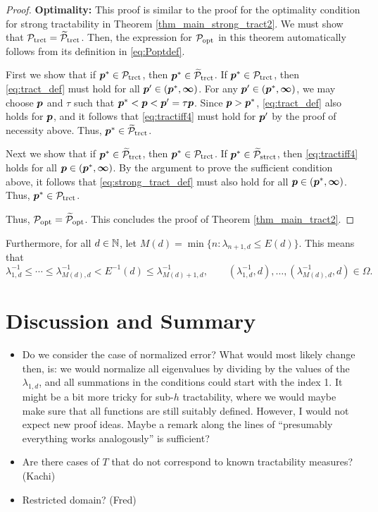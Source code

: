 \documentclass[11pt,a4paper]{article}
\newcommand{\fred}[1]{\begingroup\color{blue}#1\endgroup}
\newcommand{\peter}[1]{\begingroup\color{purple}#1\endgroup}
\newcommand{\vinfty}{\boldsymbol{\infty}}
\begin{document}
\begin{proof}
\noindent \textbf{Optimality:}
This proof is similar to the proof for the optimality condition for strong tractability in Theorem \ref{thm_main_strong_tract2}. We must show that $\mathcal{P}_{\textup{trct}} = \widetilde{\mathcal{P}}_{\textup{trct}}$.  Then, the expression for  $\mathcal{P}_{\textup{opt}}$ in this theorem automatically follows from its definition in \eqref{eq:Poptdef}.

First we show  that if $\boldsymbol{p}^* \in \mathcal{P}_{\textup{trct}}$, then $\boldsymbol{p}^* \in \widetilde{\mathcal{P}}_{\textup{trct}}$.  If $\boldsymbol{p}^* \in \mathcal{P}_{\textup{trct}}$, then \eqref{eq:tract_def} must hold for all $\vp' \in (\vp^*,\vinfty)$.  For any $\vp' \in (\vp^*,\vinfty)$, we may choose $\boldsymbol{p}$ and $\tau$ such that $\boldsymbol{p}^* < \boldsymbol{p} < \boldsymbol{p}' = \tau \boldsymbol{p}$. Since $\boldsymbol{p} > \boldsymbol{p}^*$, \eqref{eq:tract_def} also holds for $\boldsymbol{p}$, and it follows that \eqref{eq:tractiff4} must hold for $\boldsymbol{p}'$ by the proof of necessity above.  Thus, $\boldsymbol{p}^* \in \widetilde{\mathcal{P}}_{\textup{trct}}$.

Next we show that if $\boldsymbol{p}^* \in \widetilde{\mathcal{P}}_{\textup{trct}}$, then $\boldsymbol{p}^* \in \mathcal{P}_{\textup{trct}}$.  If $\boldsymbol{p}^* \in \widetilde{\mathcal{P}}_{\textup{strct}}$, then \eqref{eq:tractiff4}  holds for all $\vp \in (\vp^*,\vinfty)$.  By the argument to prove the sufficient condition above, it follows that \eqref{eq:strong_tract_def} must also hold for all $\vp \in (\vp^*,\vinfty)$. Thus, $\boldsymbol{p}^* \in \mathcal{P}_{\textup{trct}}$.


Thus,  $\mathcal{P}_{\textup{opt}}= \widetilde{\mathcal{P}}_{\textup{opt}}$.  This concludes the proof of Theorem \ref{thm_main_tract2}.
\end{proof}




Furthermore, for all $d \in \mathbb{N}$, let $M(d) = \min \{n : \lambda_{n+1,d} \le E(d) \}$.  This means that 
\[
\lambda_{1,d}^{-1} \le \cdots \le \lambda_{M(d),d}^{-1} < E^{-1}(d) \le \lambda_{M(d)+1,d}^{-1}, \qquad (\lambda_{1,d}^{-1},d), \ldots, (\lambda_{M(d),d}^{-1},d) \in \Omega.
\]




\section{Discussion and Summary}

\fred{
\begin{itemize}
\item Do we consider the case of normalized error? \peter{What would most likely change then, is: we would normalize all eigenvalues by dividing by the values of the $\lambda_{1,d}$, and all summations in the conditions could start with the index 1. It might be a bit more tricky for sub-$h$ tractability, where we would maybe make sure that all functions are still suitably defined. However, I would not expect new proof ideas. Maybe a remark along the lines of ``presumably everything works analogously'' is sufficient?}
\item Are there cases of $T$ that do not correspond to known tractability measures? (Kachi)
\item Restricted domain? (Fred)
\end{itemize}}
\end{document}
